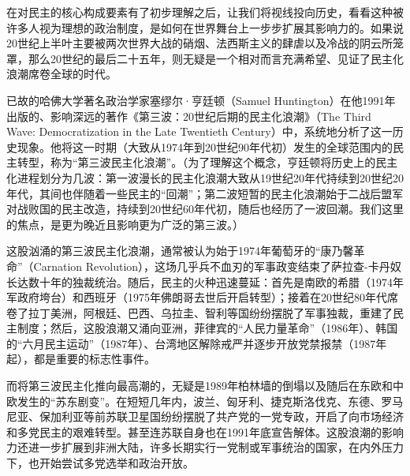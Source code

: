 \documentclass[UTF8, 10pt]{ctexbook}
\begin{document}
\lettrine[lines=2]{在}{对}民主的核心构成要素有了初步理解之后，让我们将视线投向历史，看看这种被许多人视为理想的政治制度，是如何在世界舞台上一步步扩展其影响力的。如果说20世纪上半叶主要被两次世界大战的硝烟、法西斯主义的肆虐以及冷战的阴云所笼罩，那么20世纪的最后二十五年，则无疑是一个相对而言充满希望、见证了民主化浪潮席卷全球的时代。

已故的哈佛大学著名政治学家塞缪尔·亨廷顿（Samuel Huntington）在他1991年出版的、影响深远的著作《第三波：20世纪后期的民主化浪潮》（The Third Wave: Democratization in the Late Twentieth Century）中，系统地分析了这一历史现象。他将这一时期（大致从1974年到20世纪90年代初）发生的全球范围内的民主转型，称为“第三波民主化浪潮”。（为了理解这个概念，亨廷顿将历史上的民主化进程划分为几波：第一波漫长的民主化浪潮大致从19世纪20年代持续到20世纪20年代，其间也伴随着一些民主的“回潮”；第二波短暂的民主化浪潮始于二战后盟军对战败国的民主改造，持续到20世纪60年代初，随后也经历了一波回潮。我们这里的焦点，是更为晚近且影响更为广泛的第三波。）

这股汹涌的第三波民主化浪潮，通常被认为始于1974年葡萄牙的“康乃馨革命”（Carnation Revolution），这场几乎兵不血刃的军事政变结束了萨拉查-卡丹奴长达数十年的独裁统治。随后，民主的火种迅速蔓延：首先是南欧的希腊（1974年军政府垮台）和西班牙（1975年佛朗哥去世后开启转型）；接着在20世纪80年代席卷了拉丁美洲，阿根廷、巴西、乌拉圭、智利等国纷纷摆脱了军事独裁，重建了民主制度；然后，这股浪潮又涌向亚洲，菲律宾的“人民力量革命”（1986年）、韩国的“六月民主运动”（1987年）、台湾地区解除戒严并逐步开放党禁报禁（1987年起），都是重要的标志性事件。

而将第三波民主化推向最高潮的，无疑是1989年柏林墙的倒塌以及随后在东欧和中欧发生的“苏东剧变”。在短短几年内，波兰、匈牙利、捷克斯洛伐克、东德、罗马尼亚、保加利亚等前苏联卫星国纷纷摆脱了共产党的一党专政，开启了向市场经济和多党民主的艰难转型。甚至连苏联自身也在1991年底宣告解体。这股浪潮的影响力还进一步扩展到非洲大陆，许多长期实行一党制或军事统治的国家，在内外压力下，也开始尝试多党选举和政治开放。
\end{document}
